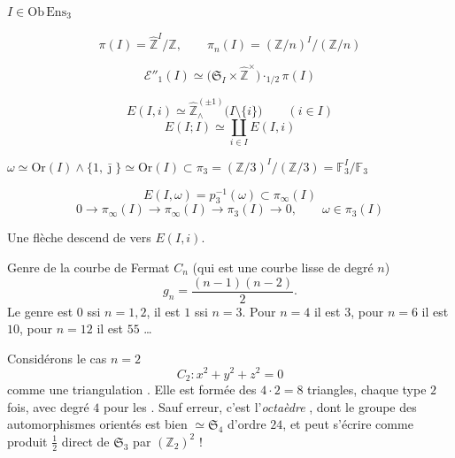 \documentclass[11pt,a4paper]{article}
\begin{document}

$I \in \mathrm{Ob}\,\mathrm{Ens}_3$

\[
  \pi(I) = \hat{\mathbb{Z}}^{I} / \hat{\mathbb{Z}},
  \qquad
  \pi_n(I) = (\mathbb{Z}/n)^{I} / (\mathbb{Z}/n)
\]


\[
  \mathcal{E}''_{1}(I) \simeq \bigl(\mathfrak{S}_I \times \hat{\mathbb{Z}}^{\times}\bigr) \cdot_{1/2} \pi(I)
\]

\[
  E(I, i) \simeq \hat{\mathbb{Z}}^{(\pm 1)}_{\wedge}\bigl(I \setminus \{i\}\bigr)
  \qquad (i \in I)
\]
\[
  E(I; I) \simeq \coprod_{i \in I} E(I, i)
\]

\struck{\ill{}} \quad
$\omega \simeq \mathrm{Or}(I) \wedge \{1, \bar{\jmath}\} \simeq \mathrm{Or}(I) \subset \pi_3 = (\mathbb{Z}/3)^{I}/(\mathbb{Z}/3) = \mathbb{F}_3^{I}/\mathbb{F}_3$

\[
  E(I, \omega) = p_3^{-1}(\omega) \subset \pi_\infty(I)
\]
\[
  0 \to \pi_\infty(I) \to \pi_\infty(I) \to \pi_3(I) \to 0,
  \qquad \omega \in \pi_3(I)
\]

Une flèche descend de \struck{\ill{}} vers $E(I, i)$.

Genre de la courbe de Fermat $C_n$ (qui est une courbe \struck{\ill{}} \add{\ill{}} lisse de degré $n$)
\[
  g_n = \frac{(n-1)(n-2)}{2}.
\]
Le genre est $0$ ssi $n = 1, 2$, il est $1$ ssi $n = 3$. Pour $n = 4$ il est $3$, pour $n = 6$ il est $10$, pour $n = 12$ il est $55$ …

Considérons le cas $n = 2$
\[
  C_2 : x^2 + y^2 + z^2 = 0
\]
comme une triangulation . Elle est formée des $4 \cdot 2 = 8$ triangles, chaque type \ill{}  $2$ fois, avec degré \ill{} $4$  \ill{} pour les \ill{} \ill{}. Sauf erreur, c'est l'\emph{octaèdre} , dont le groupe des automorphismes orientés est bien $\simeq \mathfrak{S}_4$ d'ordre $24$, et peut s'écrire comme produit $\tfrac12$ direct de $\mathfrak{S}_3$ par $(\mathbb{Z}_2)^2$ !
\end{document}
